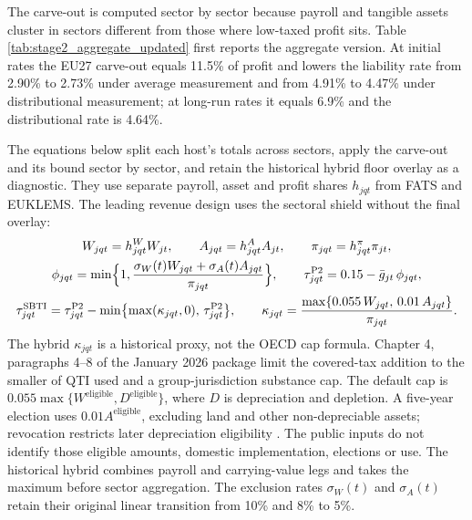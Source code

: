 \documentclass[11pt,a4paper]{article}
\begin{document}
The carve-out is computed sector by sector because payroll and tangible assets cluster in sectors different from those where low-taxed profit sits. Table \ref{tab:stage2_aggregate_updated} first reports the aggregate version. At initial rates the EU27 carve-out equals 11.5\% of profit and lowers the liability rate from 2.90\% to 2.73\% under average measurement and from 4.91\% to 4.47\% under distributional measurement; at long-run rates it equals 6.9\% and the distributional rate is 4.64\%.



The equations below split each host's totals across sectors, apply the carve-out and its bound sector by sector, and retain the historical hybrid floor overlay as a diagnostic. They use separate payroll, asset and profit shares $h_{jqt}$ from FATS and EUKLEMS. The leading revenue design uses the sectoral shield without the final overlay:
\begin{gather}
W_{jqt}=h^{W}_{jqt}W_{jt},\qquad A_{jqt}=h^{A}_{jqt}A_{jt},\qquad \pi_{jqt}=h^{\pi}_{jqt}\pi_{jt},\label{eq:app_sector_split}\\
\phi_{jqt}=\min\Bigl\{1,\frac{\sigma_W(t)W_{jqt}+\sigma_A(t)A_{jqt}}{\pi_{jqt}}\Bigr\},\qquad
\tau^{\mathrm{P2}}_{jqt}=0.15-\bar g_{jt}\,\phi_{jqt},\label{eq:app_sector_floor}\\
\tau^{\mathrm{SBTI}}_{jqt}=\tau^{\mathrm{P2}}_{jqt}-\min\bigl\{\max(\kappa_{jqt},0),\,\tau^{\mathrm{P2}}_{jqt}\bigr\},\qquad
\kappa_{jqt}=\frac{\max\{0.055\,W_{jqt},\,0.01\,A_{jqt}\}}{\pi_{jqt}}.\label{eq:app_sbti}
\end{gather}
The hybrid $\kappa_{jqt}$ is a historical proxy, not the OECD cap formula. Chapter 4, paragraphs 4–8 of the January 2026 package limit the covered-tax addition to the smaller of QTI used and a group-jurisdiction substance cap. The default cap is $0.055\max\{W^{\mathrm{eligible}},D^{\mathrm{eligible}}\}$, where $D$ is depreciation and depletion. A five-year election uses $0.01A^{\mathrm{eligible}}$, excluding land and other non-depreciable assets; revocation restricts later depreciation eligibility \citep{oecd2026}. The public inputs do not identify those eligible amounts, domestic implementation, elections or use. The historical hybrid combines payroll and carrying-value legs and takes the maximum before sector aggregation. The exclusion rates $\sigma_W(t)$ and $\sigma_A(t)$ retain their original linear transition from 10\% and 8\% to 5\%.


\end{document}
